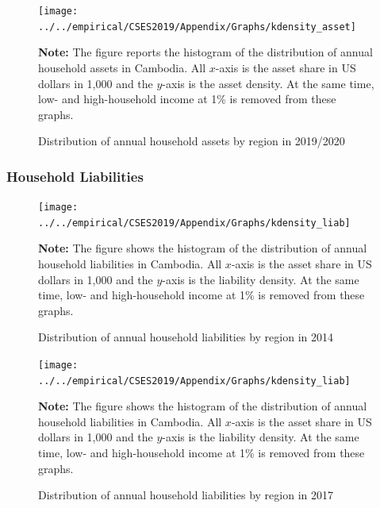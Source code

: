 \documentclass[11pt,letterpaper]{article}
\begin{document}
\begin{figure}
	\centering
	\caption{Distribution of annual household assets by region in 2019/2020}
	\label{}
	\texttt{[image: ../../empirical/CSES2019/Appendix/Graphs/kdensity\_asset]}
	\begin{tablenotes}
		\footnotesize
		\item \textbf{Note:} The figure reports the histogram of the distribution of annual household assets in Cambodia. All $x$-axis is the asset share in US dollars in 1,000 and the $y$-axis is the asset density. At the same time, low- and high-household income at 1\% is removed from these graphs. 
	\end{tablenotes} 
\end{figure}
\clearpage
\subsubsection{Household Liabilities}
\begin{figure}[h!]
	\centering
	\caption{Distribution of annual household liabilities by region in 2014}
	\label{}
	\texttt{[image: ../../empirical/CSES2019/Appendix/Graphs/kdensity\_liab]}
	\begin{tablenotes}
		\footnotesize
		\item \textbf{Note:} The figure shows the histogram of the distribution of annual household liabilities in Cambodia. All $x$-axis is the asset share in US dollars in 1,000 and the $y$-axis is the liability density. At the same time, low- and high-household income at 1\% is removed from these graphs. 
	\end{tablenotes} 
\end{figure}

\begin{figure}[]
	\centering
	\caption{Distribution of annual household liabilities by region in 2017}
	\label{}
	\texttt{[image: ../../empirical/CSES2019/Appendix/Graphs/kdensity\_liab]}
	\begin{tablenotes}
		\footnotesize
		\item \textbf{Note:} The figure shows the histogram of the distribution of annual household liabilities in Cambodia. All $x$-axis is the asset share in US dollars in 1,000 and the $y$-axis is the liability density. At the same time, low- and high-household income at 1\% is removed from these graphs. 
	\end{tablenotes} 
\end{figure}
\end{document}
